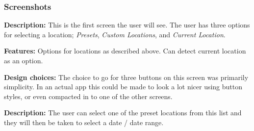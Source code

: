 \documentclass[11pt,english,numbers=endperiod,parskip=half]{scrartcl}
\begin{document}
\subsubsection{Screenshots}
\begin{figure}[H]
\end{figure}
\bigskip
\textbf{Description: }This is the first screen the user will see.
The user has three options for selecting a location;
\textit{Presets}, \textit{Custom Locations}, and \textit{Current Location}.

\textbf{Features: }Options for locations as described above. Can detect current
location as an option.

\textbf{Design choices: }The choice to go for three buttons on this screen was
primarily simplicity. In an actual app this could be made to look a lot nicer
using button styles, or even compacted in to one of the other screens.

\begin{figure}[H]
\end{figure}
\bigskip
\textbf{Description: }The user can select one of the preset locations from this
list and they will then be taken to select a date / date range.
\end{document}
